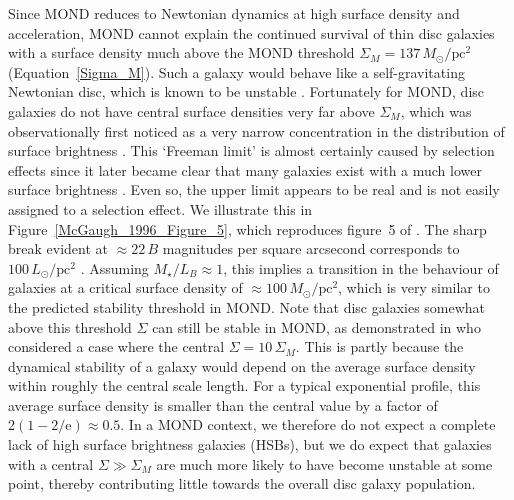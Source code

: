 \documentclass[fleqn,usenatbib,useAMS,onecolumn]{mnras} %
\begin{document}
Since MOND reduces to Newtonian dynamics at high surface density and acceleration, MOND cannot explain the continued survival of thin disc galaxies with a surface density much above the MOND threshold $\Sigma_M = 137 \, M_\odot/\text{pc}^2$ (Equation~\ref{Sigma_M}). Such a galaxy would behave like a self-gravitating Newtonian disc, which is known to be unstable \citep{Hohl_1971}. Fortunately for MOND, disc galaxies do not have central surface densities very far above $\Sigma_M$, which was observationally first noticed as a very narrow concentration in the distribution of surface brightness \citep{Freeman_1970, Kruit_1987}. This `Freeman limit' is almost certainly caused by selection effects \citep{Disney_1976} since it later became clear that many galaxies exist with a much lower surface brightness \citep{McGaugh_1995_number_density}. Even so, the upper limit appears to be real \citep{McGaugh_1996, Zavala_2003, Fathi_2010} and is not easily assigned to a selection effect. We illustrate this in Figure~\ref{McGaugh_1996_Figure_5}, which reproduces figure~5 of \citet{McGaugh_1996}. The sharp break evident at $\approx 22 \, B$ magnitudes per square arcsecond corresponds to $100 \, L_\odot/\text{pc}^2$ \citep{Willmer_2018}. Assuming $M_{\star}/L_B \approx 1$, this implies a transition in the behaviour of galaxies at a critical surface density of $\approx 100 \, M_\odot/\text{pc}^2$, which is very similar to the predicted stability threshold in MOND. Note that disc galaxies somewhat above this threshold $\Sigma$ can still be stable in MOND, as demonstrated in \citet{Roshan_2021_disc_stability} who considered a case where the central $\Sigma = 10 \, \Sigma_M$. This is partly because the dynamical stability of a galaxy would depend on the average surface density within roughly the central scale length. For a typical exponential profile, this average surface density is smaller than the central value by a factor of $2\left(1 - 2/\mathrm{e}\right) \approx 0.5$. In a MOND context, we therefore do not expect a complete lack of high surface brightness galaxies (HSBs), but we do expect that galaxies with a central $\Sigma \gg \Sigma_M$ are much more likely to have become unstable at some point, thereby contributing little towards the overall disc galaxy population.
\end{document}
